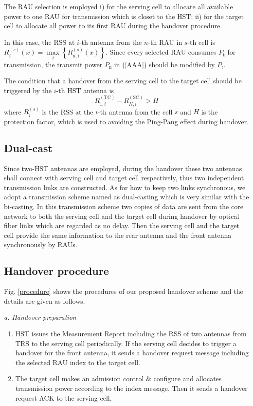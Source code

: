 \documentclass[a4paper,twocolumn,10pt]{IEEEtran}
\begin{document}
The RAU selection is employed i) for the serving cell to allocate all available power to one RAU for transmission which is closet to the HST;  ii) for the target cell to allocate all power to its first RAU during the handover procedure.

In this case, the RSS at  $i$-th antenna from the $n$-th RAU in $s$-th cell is $R_i^{\left( s \right)}\left(x\right)=\mathop {\max }\limits_i \left\{ {R_{n,i}^{\left( s \right)}\left(x\right)} \right\}$. Since every selected RAU consumes $P_\textrm{t}$ for transmission, the transmit power $P_\textrm{n}$ in (\ref{AAA}) should be modified by $P_\textrm{t}$.

The condition that a handover from the serving cell to the target cell should be triggered by the $i$-th HST antenna is
\begin{equation}
{R_{1,i}^{\left(\textrm{TC}\right)}} - {R_{N,i} ^{\left(\textrm{SC}\right)}}> H
\end{equation}
where ${R_i^{\left(s\right)}}$ is the RSS at the $i$-th antenna from the cell $s$ and $H$ is the protection factor, which is used to avoiding the Ping-Pang effect during handover.

\subsection{Dual-cast}
Since two-HST antennas are employed, during the handover these two antennas shall connect with serving cell and target cell respectively, thus two independent transmission links are constructed.  As for how to keep two links synchronous, we adopt a transmission scheme named as dual-casting which is very similar with the bi-casting\textcolor[rgb]{0,0,0}{\cite{bi-casting}}. In this transmission scheme two copies of data are sent from the core network to both the serving cell and the target cell during handover by optical fiber links which are regarded as no delay. Then the serving cell and the target cell provide the same information to the rear antenna and the front antenna synchronously by RAUs.

\subsection{Handover procedure}
Fig. \ref{procedure} shows the procedures of our proposed handover scheme and the details are given as follows.

\emph{a. Handover preparation}

\begin{enumerate}
\item HST issues the Measurement Report including the RSS of two antennas from TRS to the serving cell periodically. If the serving cell decides to trigger a handover for the front antenna, it sends a handover request message including the selected RAU index to the target cell.
\item The target cell makes an admission control $\&$ configure and allocates transmission power according to the index message. Then it sends a handover request ACK to the serving cell.
\end{enumerate}
\end{document}
